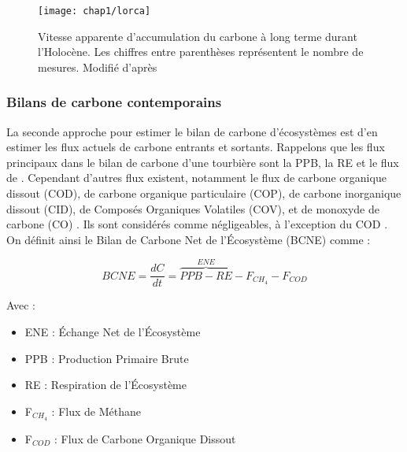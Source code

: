 \begin{figure}
\centering
\texttt{[image: chap1/lorca]}
\caption{Vitesse apparente d'accumulation du carbone à long terme durant l'Holocène. Les chiffres entre parenthèses représentent le nombre de mesures. Modifié d'après \citet{yu2009}}
\label{fig:lorca}
\end{figure}

\subsubsection{Bilans de carbone contemporains}

La seconde approche pour estimer le bilan de carbone d'écosystèmes est d'en estimer les flux actuels de carbone entrants et sortants.
Rappelons que les flux principaux dans le bilan de carbone d'une tourbière sont la PPB, la RE et le flux de \chh.
Cependant d'autres flux existent, notamment le flux de carbone organique dissout (COD), de carbone organique particulaire (COP), de carbone inorganique dissout (CID), de Composés Organiques Volatiles (COV), et de monoxyde de carbone (CO) \citep{chapin2006}.
Ils sont considérés comme négligeables, à l'exception du COD \citep{worrall2009}.
On définit ainsi le Bilan de Carbone Net de l'Écosystème (BCNE) comme :

\begin{equation}
BCNE=\frac{dC}{dt}=\overbrace{PPB - RE}^{ENE} - F_{CH_{4}} - F_{COD}
\label{bdc}
\end{equation}

Avec : 
\begin{itemize}
\item ENE : Échange Net de l'Écosystème
\item PPB : Production Primaire Brute
\item RE : Respiration de l'Écosystème
\item F$_{CH_{4}}$ : Flux de Méthane
\item F$_{COD}$ : Flux de Carbone Organique Dissout
\end{itemize}

